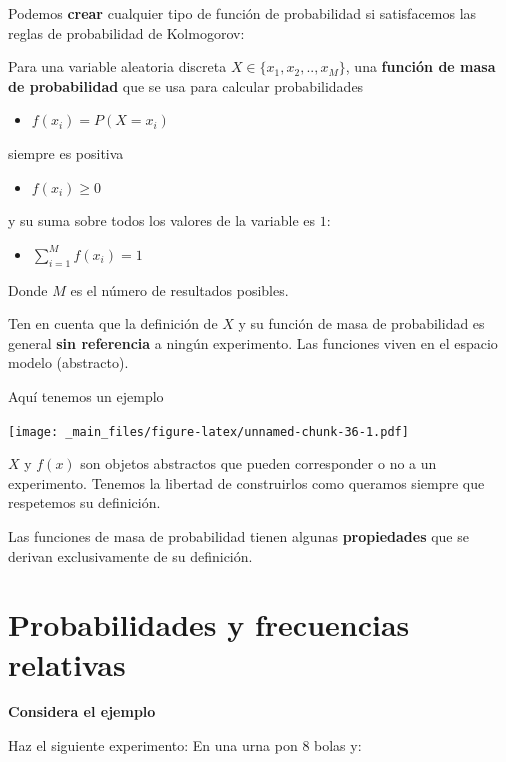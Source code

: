 \documentclass[
]{book}
\providecommand{\tightlist}{%
  \setlength{\itemsep}{0pt}\setlength{\parskip}{0pt}}
\begin{document}
Podemos \textbf{crear} cualquier tipo de función de probabilidad si satisfacemos las reglas de probabilidad de Kolmogorov:

Para una variable aleatoria discreta \(X \in \{x_1 , x_2 , .. , x_M\}\), una \textbf{función de masa de probabilidad} que se usa para calcular probabilidades

\begin{itemize}
\tightlist
\item
  \(f(x_i)=P(X=x_i)\)
\end{itemize}

siempre es positiva

\begin{itemize}
\tightlist
\item
  \(f(x_i)\geq 0\)
\end{itemize}

y su suma sobre todos los valores de la variable es \(1\):

\begin{itemize}
\tightlist
\item
  \(\sum_{i=1}^M f(x_i)=1\)
\end{itemize}

Donde \(M\) es el número de resultados posibles.

Ten en cuenta que la definición de \(X\) y su función de masa de probabilidad es general \textbf{sin referencia} a ningún experimento. Las funciones viven en el espacio modelo (abstracto).

Aquí tenemos un ejemplo

\texttt{[image: \_main\_files/figure-latex/unnamed-chunk-36-1.pdf]}

\(X\) y \(f(x)\) son objetos abstractos que pueden corresponder o no a un experimento. Tenemos la libertad de construirlos como queramos siempre que respetemos su definición.

Las funciones de masa de probabilidad tienen algunas \textbf{propiedades} que se derivan exclusivamente de su definición.

\hypertarget{probabilidades-y-frecuencias-relativas}{%
\section{Probabilidades y frecuencias relativas}\label{probabilidades-y-frecuencias-relativas}}

\textbf{Considera el ejemplo}

Haz el siguiente experimento: En una urna pon \(8\) bolas y:
\end{document}

